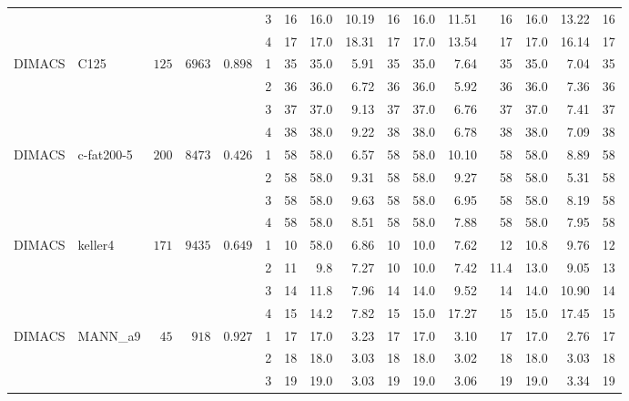 \documentclass[draft,final]{vutinfth} %
\begin{document}
\begin{table}
{\begin{tabular}{llrrrr | rrr rrr rrr r}
               &          &      &       &               & 3 & 16 & 16.0 & 10.19 & 16 & 16.0 & 11.51 & 16 & 16.0 & 13.22 & 16\\
               &          &      &       &               & 4 & 17 & 17.0 & 18.31 & 17 & 17.0 & 13.54 & 17 & 17.0 & 16.14 & 17\\
        DIMACS & C125 & $125$ & $6963$ & $0.898$   & 1 & 35 & 35.0 & 5.91 & 35 & 35.0 & 7.64 & 35 & 35.0 & 7.04 & 35\\
               &          &      &       &         & 2 & 36 & 36.0 & 6.72 & 36 & 36.0 & 5.92 & 36 & 36.0 & 7.36 & 36\\
               &          &      &       &         & 3 & 37 & 37.0 & 9.13 & 37 & 37.0 & 6.76 & 37 & 37.0 & 7.41 & 37\\
               &          &      &       &         & 4 & 38 & 38.0 & 9.22 & 38 & 38.0 & 6.78 & 38 & 38.0 & 7.09 & 38\\
        DIMACS & c-fat200-5 & $200$ & $8473$ & $0.426$ & 1 & 58 & 58.0 & 6.57 & 58 & 58.0 & 10.10 & 58 & 58.0 & 8.89 & 58\\
        &          &      &       &                    & 2 & 58 & 58.0 & 9.31 & 58 & 58.0 & 9.27 & 58 & 58.0 & 5.31 & 58\\
        &          &      &       &                    & 3 & 58 & 58.0 & 9.63 & 58 & 58.0 & 6.95 & 58 & 58.0 & 8.19 & 58\\
        &          &      &       &                    & 4 & 58 & 58.0 & 8.51 & 58 & 58.0 & 7.88 & 58 & 58.0 & 7.95 & 58\\
        DIMACS & keller4 & $171$ & $9435$ & $0.649$    & 1 & 10 & 58.0 & 6.86 & 10 & 10.0 & 7.62 & 12 & 10.8 & 9.76 & 12\\
        &          &      &       &                    & 2 & 11 & 9.8 & 7.27 & 10 & 10.0 & 7.42 & 11.4 & 13.0 & 9.05 & 13\\
        &          &      &       &                    & 3 & 14 & 11.8 & 7.96 & 14 & 14.0 & 9.52 & 14 & 14.0 & 10.90 & 14\\
        &          &      &       &                    & 4 & 15 & 14.2 & 7.82 & 15 & 15.0 & 17.27 & 15 & 15.0 & 17.45 & 15\\
        DIMACS & MANN\_a9 & $45$ & $918$ & $0.927$ & 1 & 17 & 17.0 & 3.23 & 17 & 17.0 & 3.10 & 17 & 17.0 & 2.76 & 17\\
               &          &      &       &         & 2 & 18 & 18.0 & 3.03 & 18 & 18.0 & 3.02 & 18 & 18.0 & 3.03 & 18\\
               &          &      &       &         & 3 & 19 & 19.0 & 3.03 & 19 & 19.0 & 3.06 & 19 & 19.0 & 3.34 & 19\\

\end{tabular}}
\end{table}
\end{document}
